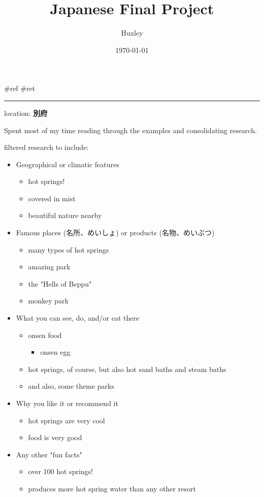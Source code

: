 \documentclass[letterpaper]{article}
\author{Huxley}
\date{\today}
\title{Japanese Final Project}
\renewcommand\maketitle{}
\begin{document}
\maketitle
\#ref \#ret

\noindent\rule{\textwidth}{0.5pt}

location: \textbf{別府}

Spent most of my time reading through the examples and consolidating
research.

filtered research to include:

\begin{itemize}
\item Geographical or climatic features

\begin{itemize}
\item hot springs!
\item covered in mist
\item beautiful nature nearby
\end{itemize}

\item Famous places (名所、めいしょ) or products (名物、めいぶつ)

\begin{itemize}
\item many types of hot springs
\item amazing park
\item the "Hells of Beppu"
\item monkey park
\end{itemize}

\item What you can see, do, and/or eat there

\begin{itemize}
\item onsen food

\begin{itemize}
\item onsen egg
\end{itemize}

\item hot springs, of course, but also hot sand baths and steam baths
\item and also, some theme parks
\end{itemize}

\item Why you like it or recommend it

\begin{itemize}
\item hot springs are very cool
\item food is very good
\end{itemize}

\item Any other "fun facts"

\begin{itemize}
\item over 100 hot springs!
\item produces more hot spring water than any other resort
\end{itemize}
\end{itemize}
\end{document}
